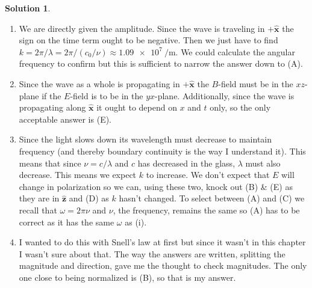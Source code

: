 \documentclass[10pt]{article}
\theoremstyle{definition}
\newtheorem{soln}{Solution}
\newcommand{\ux}{\hat{\mathbf{x}}}
\newcommand{\uz}{\hat{\mathbf{z}}}
\begin{document}
\begin{soln}~
\begin{enumerate}[label=(\roman*)]
  \item We are directly given the amplitude. Since the wave is traveling in $+\ux$ the sign on the time term ought to be negative. Then we just have to find
  $k=2\pi/\lambda=2\pi/(c_0/\nu)\approx \qty{1.09e7}{\per\meter}$. We could calculate the angular frequency to confirm but this is sufficient to 
  narrow the answer down to (A).
  \item Since the wave as a whole is propagating in $+\ux$ the $B$-field must be in the $xz$-plane if the $E$-field is to be in the $yx$-plane. Additionally,
  since the wave is propagating along $\ux$ it ought to depend on $x$ and $t$ only, so the only acceptable answer is (E).
  \item Since the light slows down its wavelength must decrease to maintain frequency (and thereby boundary continuity is the way I understand it).
  This means that since $\nu =c/\lambda$ and $c$ has decreased in the glass, $\lambda$ must also decrease. This means we expect $k$ to increase.
  We don't expect that $E$ will change in polarization so we can, using these two, knock out (B) \& (E) as they are in $\uz$ and 
  (D) as $k$ hasn't changed. To select between (A) and (C) we recall that $\omega=2\pi\nu$ and $\nu$, the frequency, remains the same so (A)
  has to be correct as it has the same $\omega$ as (i).
  \item I wanted to do this with Snell's law at first but since it wasn't in this chapter I wasn't sure about that. The way the answers are written,
  splitting the magnitude and direction, gave me the thought to check magnitudes. The only one close to being normalized is (B), so that is my answer.
\end{enumerate}
\end{soln}
\end{document}
